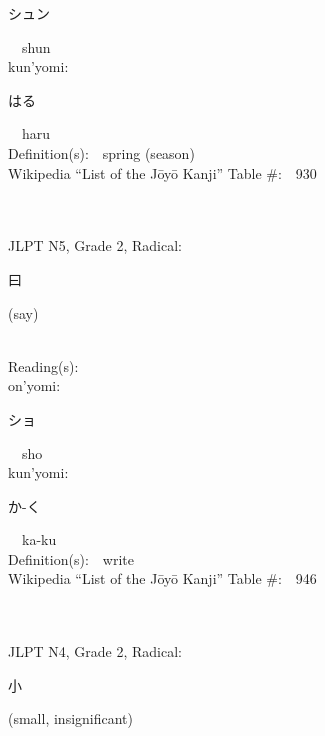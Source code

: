 \begin{multicols}{2}
{\hspace*{2em}}{\begin{CJK}{UTF8}{min} シュン \end{CJK}}\ \ shun\ \ \\
{\hspace*{1em}}kun'yomi:\ \ \\
{\hspace*{2em}}{\begin{CJK}{UTF8}{min} はる \end{CJK}}\ \ haru\ \ \\
Definition(s):\ \ spring (season) \\
Wikipedia ``List of the J\=oy\=o Kanji'' Table \#:\ \ 930 \\
\ \ \\
{\fontsize{34pt}{40pt}  }\ \ \\  %
{JLPT N5, Grade 2, Radical:\ \ {\begin{CJK}{UTF8}{min} 曰 \end{CJK}} (say) } \\
Reading(s):\ \ \\
{\hspace*{1em}}on'yomi:\ \ \\
{\hspace*{2em}}{\begin{CJK}{UTF8}{min} ショ \end{CJK}}\ \ sho\ \ \\
{\hspace*{1em}}kun'yomi:\ \ \\
{\hspace*{2em}}{\begin{CJK}{UTF8}{min} か-く \end{CJK}}\ \ ka-ku\ \ \\
Definition(s):\ \ write \\
Wikipedia ``List of the J\=oy\=o Kanji'' Table \#:\ \ 946 \\
\ \ \\
{\fontsize{34pt}{40pt}  }\ \ \\  %
{JLPT N4, Grade 2, Radical:\ \ {\begin{CJK}{UTF8}{min} 小 \end{CJK}} (small, insignificant) } \\

\end{multicols}
